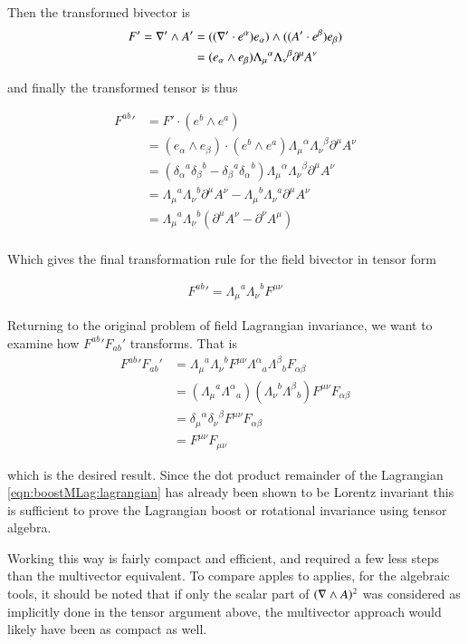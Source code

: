 Then the transformed bivector is
\begin{align*}
F' = \nabla' \wedge A'
&= ((\nabla' \cdot e^\alpha) e_\alpha) \wedge ((A' \cdot e^\beta) e_\beta) \\
&= (e_\alpha \wedge e_\beta) {\Lambda_\mu}^\alpha {\Lambda_\nu}^\beta \partial^\mu A^\nu \\
\end{align*}

and finally the transformed tensor is thus

\begin{align*}
{F^{ab}}'
&= F' \cdot (e^b \wedge e^a) \\
&= (e_\alpha \wedge e_\beta) \cdot (e^b \wedge e^a) {\Lambda_\mu}^\alpha {\Lambda_\nu}^\beta \partial^\mu A^\nu \\
&= ( {\delta_\alpha}^a {\delta_\beta}^b - {\delta_\beta}^a {\delta_\alpha}^b ) {\Lambda_\mu}^\alpha {\Lambda_\nu}^\beta \partial^\mu A^\nu \\
&= {\Lambda_\mu}^a {\Lambda_\nu}^b \partial^\mu A^\nu
-{\Lambda_\mu}^b {\Lambda_\nu}^a \partial^\mu A^\nu \\
&= {\Lambda_\mu}^a {\Lambda_\nu}^b ( \partial^\mu A^\nu -\partial^\nu A^\mu ) \\
\end{align*}

Which gives the final transformation rule for the field bivector in tensor form

\begin{align}
{F^{ab}}' = {\Lambda_\mu}^a {\Lambda_\nu}^b F^{\mu\nu}
\end{align}

Returning to the original problem of field Lagrangian invariance, we want to examine how ${F^{ab}}' {F_{ab}}'$ transforms.  That is
\begin{align}
{F^{ab}}' {F_{ab}}'
&= {\Lambda_\mu}^a {\Lambda_\nu}^b F^{\mu\nu} {\Lambda^\alpha}_a {\Lambda^\beta}_b F_{\alpha\beta} \\
&= ({\Lambda_\mu}^a {\Lambda^\alpha}_a) ({\Lambda_\nu}^b {\Lambda^\beta}_b) F^{\mu\nu} F_{\alpha\beta} \\
&= {\delta_\mu}^\alpha {\delta_\nu}^\beta F^{\mu\nu} F_{\alpha\beta} \\
&= F^{\mu\nu} F_{\mu\nu}
\end{align}

which is the desired result.  Since the dot product remainder of the Lagrangian \ref{eqn:boostMLag:lagrangian}
has already been shown to be Lorentz invariant this is sufficient to prove the Lagrangian boost or rotational invariance using tensor algebra.

Working this way is fairly compact and efficient, and required a few less steps than the multivector equivalent.  To compare apples to applies,
for the algebraic tools, it should be noted that if only the 
scalar part of $(\nabla \wedge A)^2$ was considered as implicitly done in the tensor argument above, the multivector approach would likely have been as 
compact as well.

